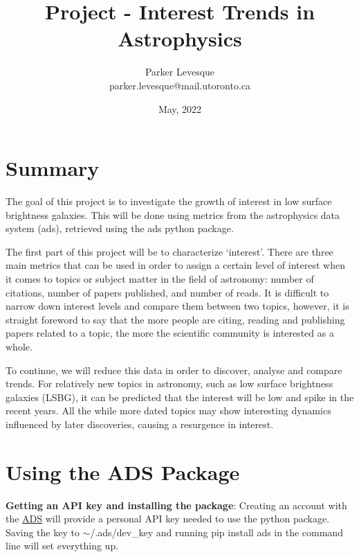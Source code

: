 \documentclass[10pt, letterpaper]{article}
\title{Project - Interest Trends in Astrophysics}
\author{Parker Levesque \\ parker.levesque@mail.utoronto.ca}
\date{May, 2022}
\begin{document}
\maketitle
\vspace{1cm}

\section{Summary}

The goal of this project is to investigate the growth of interest in low surface brightness galaxies. This will be done using metrics from the astrophysics data system (ads), retrieved using the ads python package.

The first part of this project will be to characterize `interest'. There are three main metrics that can be used in order to assign a certain level of interest when it comes to topics or subject matter in the field of astronomy: number of citations, number of papers published, and number of reads. It is difficult to narrow down interest levels and compare them between two topics, however, it is straight foreword to say that the more people are citing, reading and publishing papers related to a topic, the more the scientific community is interested as a whole.


To continue, we will reduce this data in order to discover, analyse and compare trends. For relatively new topics in astronomy, such as low surface brightness galaxies (LSBG), it can be predicted that the interest will be low and spike in the recent years. All the while more dated topics may show interesting dynamics influenced by later discoveries, causing a resurgence in interest. 

\section{Using the ADS Package}

\textbf{Getting an API key and installing the package}: Creating an account with the \href{https://ui.adsabs.harvard.edu}{ADS} will provide a personal API key needed to use the python package. Saving the key to \color{blue} $\sim$/.ads/dev\_key \color{black} and running \color{blue} pip install ads \color{black} in the command line will set everything up. \\[5mm]
\end{document}
